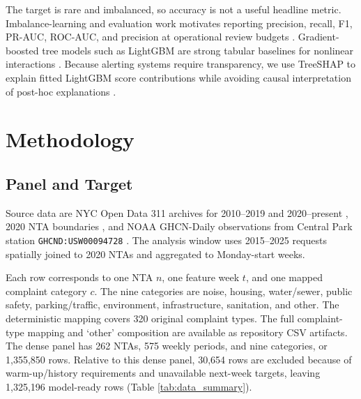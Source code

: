 \documentclass[pdflatex,sn-mathphys-num]{sn-jnl}
\begin{document}
The target is rare and imbalanced, so accuracy is not a useful headline metric. Imbalance-learning and evaluation work motivates reporting precision, recall, F1, PR-AUC, ROC-AUC, and precision at operational review budgets \cite{HeGarcia2009Imbalanced,Fawcett2006ROC,DavisGoadrich2006PRROC,SaitoRehmsmeier2015PR}. Gradient-boosted tree models such as LightGBM are strong tabular baselines for nonlinear interactions \cite{Ke2017LightGBM}. Because alerting systems require transparency, we use TreeSHAP to explain fitted LightGBM score contributions while avoiding causal interpretation of post-hoc explanations \cite{LundbergLee2017SHAP,Lundberg2020TreeSHAP,Rudin2019InterpretableML}.

\section{Methodology}\label{sec:method}

\subsection{Panel and Target}\label{subsec:panel_target}

Source data are NYC Open Data 311 archives for 2010--2019 and 2020--present \cite{NYC311HistoricalOpenData,NYC311OpenData}, 2020 NTA boundaries \cite{NYCNTA2020}, and NOAA GHCN-Daily observations from Central Park station \texttt{GHCND:USW00094728} \cite{Menne2012GHCND}. The analysis window uses 2015--2025 requests spatially joined to 2020 NTAs and aggregated to Monday-start weeks.

Each row corresponds to one NTA \(n\), one feature week \(t\), and one mapped complaint category \(c\). The nine categories are noise, housing, water/sewer, public safety, parking/traffic, environment, infrastructure, sanitation, and other. The deterministic mapping covers 320 original complaint types. The full complaint-type mapping and `other' composition are available as repository CSV artifacts. The dense panel has 262 NTAs, 575 weekly periods, and nine categories, or 1,355,850 rows. Relative to this dense panel, 30,654 rows are excluded because of warm-up/history requirements and unavailable next-week targets, leaving 1,325,196 model-ready rows (Table \ref{tab:data_summary}).
\end{document}

